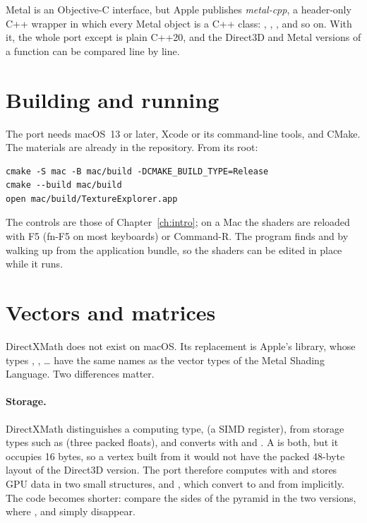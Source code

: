 Metal is an Objective-C interface, but Apple publishes \emph{metal-cpp}, a header-only C++
wrapper in which every Metal object is a C++ class: , ,
, and so on. With it, the whole port except  is
plain C++20, and the Direct3D and Metal versions of a function can be compared line by line.

\section{Building and running}
The port needs macOS~13 or later, Xcode or its command-line tools, and CMake. The materials are
already in the repository. From its root:
\begin{lstlisting}[language={},numbers=none,frame=none,basicstyle=\ttfamily\small]
cmake -S mac -B mac/build -DCMAKE_BUILD_TYPE=Release
cmake --build mac/build
open mac/build/TextureExplorer.app
\end{lstlisting}
The controls are those of Chapter~\ref{ch:intro}; on a Mac the shaders are reloaded with F5
(fn-F5 on most keyboards) or Command-R. The program finds  and
 by walking up from the application bundle, so the shaders can be edited in
place while it runs.

\section{Vectors and matrices}
\label{sec:simd}
DirectXMath does not exist on macOS. Its replacement is Apple's  library, whose types
, , \dots{} have the same names as the vector types of
the Metal Shading Language. Two differences matter.

\paragraph{Storage.} DirectXMath distinguishes a computing type,  (a SIMD
register), from storage types such as  (three packed floats), and converts with
 and . A  is both, but it occupies 16
bytes, so a vertex built from it would not have the packed 48-byte layout of the Direct3D
version. The port therefore computes with  and stores GPU data in two small
structures,  and , which convert to and from  implicitly.
The code becomes shorter: compare the sides of the pyramid in the two versions, where
,  and  simply disappear.

